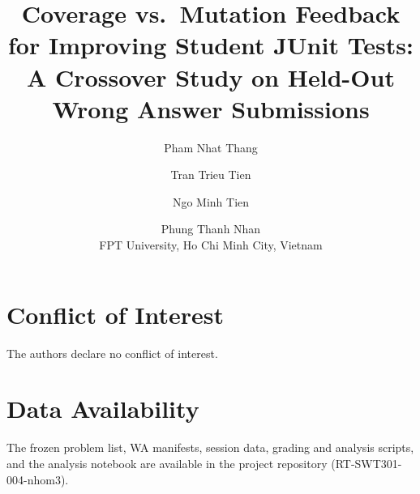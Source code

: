 \documentclass[10pt,twocolumn]{article}
\title{Coverage vs.\ Mutation Feedback for Improving Student JUnit Tests:\\ A Crossover Study on Held-Out Wrong Answer Submissions}
\author{Pham Nhat Thang \and Tran Trieu Tien \and Ngo Minh Tien \and Phung Thanh Nhan\\
\small FPT University, Ho Chi Minh City, Vietnam}
\date{}
\begin{document}
\twocolumn[\maketitle\vspace{-2em}]






\section*{Conflict of Interest}
The authors declare no conflict of interest.

\section*{Data Availability}
The frozen problem list, WA manifests, session data, grading and analysis scripts, and the analysis notebook are available in the project repository (RT-SWT301-004-nhom3).



\end{document}
